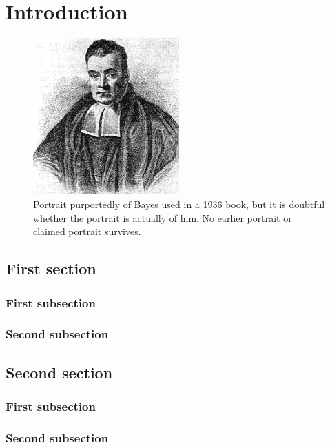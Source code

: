 \chapter{Introduction}\label{chapter:intro}
\thispagestyle{chapterBeginStyle}

\begin{figure}[ht]
    \centering
    \includegraphics[width=0.5\textwidth]{intro/images/thomas_bayes.png}
    \caption[Portrait of Thomas Bayes]{Portrait purportedly of Bayes used in a 1936 book, but it is doubtful whether the portrait is actually of him. No earlier portrait or claimed portrait survives.}
    \label{fig:thomas_bayes}
\end{figure}

\section{First section}
\subsection{First subsection}
\subsection{Second subsection}

\section{Second section}
\subsection{First subsection}
\subsection{Second subsection}